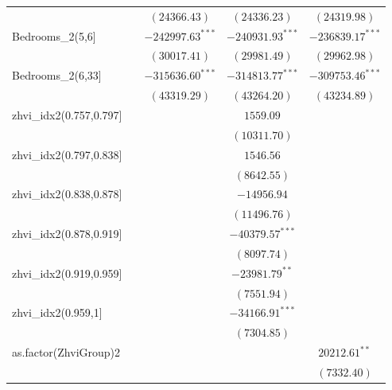 \documentclass[12pt,a4paper,landscape]{article}
\begin{document}
\begin{table}[H]
\begin{center}
\begin{tabular}{l c c c c}
			&                   & $(24366.43)$       & $(24336.23)$       & $(24319.98)$       \\
			Bedrooms\_2(5,6]        &                   & $-242997.63^{***}$ & $-240931.93^{***}$ & $-236839.17^{***}$ \\
			&                   & $(30017.41)$       & $(29981.49)$       & $(29962.98)$       \\
			Bedrooms\_2(6,33]       &                   & $-315636.60^{***}$ & $-314813.77^{***}$ & $-309753.46^{***}$ \\
			&                   & $(43319.29)$       & $(43264.20)$       & $(43234.89)$       \\
			zhvi\_idx2(0.757,0.797] &                   &                    & $1559.09$          &                    \\
			&                   &                    & $(10311.70)$       &                    \\
			zhvi\_idx2(0.797,0.838] &                   &                    & $1546.56$          &                    \\
			&                   &                    & $(8642.55)$        &                    \\
			zhvi\_idx2(0.838,0.878] &                   &                    & $-14956.94$        &                    \\
			&                   &                    & $(11496.76)$       &                    \\
			zhvi\_idx2(0.878,0.919] &                   &                    & $-40379.57^{***}$  &                    \\
			&                   &                    & $(8097.74)$        &                    \\
			zhvi\_idx2(0.919,0.959] &                   &                    & $-23981.79^{**}$   &                    \\
			&                   &                    & $(7551.94)$        &                    \\
			zhvi\_idx2(0.959,1]     &                   &                    & $-34166.91^{***}$  &                    \\
			&                   &                    & $(7304.85)$        &                    \\
			as.factor(ZhviGroup)2   &                   &                    &                    & $20212.61^{**}$    \\
			&                   &                    &                    & $(7332.40)$        \\

\end{tabular}
\end{center}
\end{table}
\end{document}
